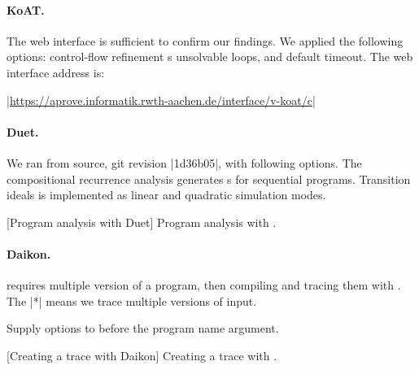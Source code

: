 \paragraph*{KoAT.}
The  web interface is sufficient to confirm our findings.
We applied the following options:
\myok{ }control-flow refinement
\myok{ }s
\myok{ }unsolvable loops, and default timeout.
The web interface address is:

\begin{center}
\href{https://aprove.informatik.rwth-aachen.de/interface/v-koat/c}%
{\pr|https://aprove.informatik.rwth-aachen.de/interface/v-koat/c|}
\end{center}

\paragraph*{Duet.}
We ran  from source, git revision \pr|1d36b05|, with following
options. The compositional recurrence analysis generates s for
sequential programs. Transition ideals is implemented as
linear and quadratic simulation modes.
\begin{center}
\begin{minipage}{\textwidth}
\captionsetup{type=lstlisting}
[Program analysis with Duet]
{Program analysis with .}
\label{lst:duet-bash}
\end{minipage}
\end{center}

\paragraph*{Daikon.}
 requires multiple version of a program, then compiling and tracing
them with . The \pr|*| means we trace multiple
versions of input. \newline

Supply options to  before the program name argument.

\begin{center}
\begin{minipage}{\textwidth}
\captionsetup{type=lstlisting}
[Creating a trace with Daikon]
{Creating a trace with .}
\label{lst:kvasir-bash}
\end{minipage}
\end{center}

